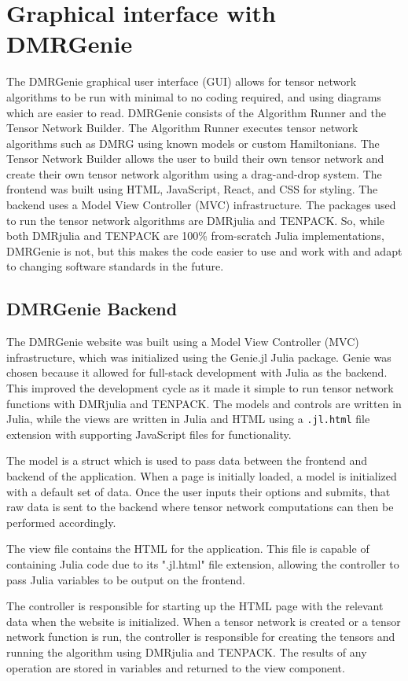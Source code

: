 \documentclass{juliacon}
\begin{document}
\section{Graphical interface with DMRGenie}
The DMRGenie graphical user interface (GUI) allows for tensor network algorithms to be run with minimal to no coding required, and using diagrams which are easier to read. DMRGenie consists of the Algorithm Runner and the Tensor Network Builder. The Algorithm Runner executes tensor network algorithms such as DMRG using known models or custom Hamiltonians. The Tensor Network Builder allows the user to build their own tensor network and create their own tensor network algorithm using a drag-and-drop system. The frontend was built using HTML, JavaScript, React, and CSS for styling. The backend uses a Model View Controller (MVC) infrastructure. The packages used to run the tensor network algorithms are DMRjulia and TENPACK. So, while both DMRjulia and TENPACK are 100\% from-scratch Julia implementations, DMRGenie is not, but this makes the code easier to use and work with and adapt to changing software standards in the future.

\subsection{DMRGenie Backend}\label{backend}
The DMRGenie website was built using a Model View Controller (MVC) infrastructure, which was initialized using the Genie.jl Julia package. Genie was chosen because it allowed for full-stack development with Julia as the backend. This improved the development cycle as it made it simple to run tensor network functions with DMRjulia and TENPACK. The models and controls are written in Julia, while the views are written in Julia and HTML using a \texttt{.jl.html} file extension with supporting JavaScript files for functionality. 

The model is a struct which is used to pass data between the frontend and backend of the application. 
When a page is initially loaded, a model is initialized with a default set of data. Once the user inputs their options and submits, that raw data is sent to the backend where tensor network computations can then be performed accordingly.

The view file contains the HTML for the application. This file is capable of containing Julia code due to its ".jl.html" file extension, allowing the controller to pass Julia variables to be output on the frontend. 

The controller is responsible for starting up the HTML page with the relevant data when the website is initialized. When a tensor network is created or a tensor network function is run, the controller is responsible for creating the tensors and running the algorithm using DMRjulia and TENPACK. The results of any operation are stored in variables and returned to the view component.
\end{document}
